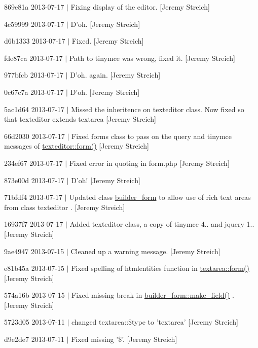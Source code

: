 \begin{DoxyItemize}
\item 869e81a 2013-\/07-\/17 $|$ Fixing display of the editor. \mbox{[}Jeremy Streich\mbox{]}
\item 4c59999 2013-\/07-\/17 $|$ D'oh. \mbox{[}Jeremy Streich\mbox{]}
\item d6b1333 2013-\/07-\/17 $|$ Fixed. \mbox{[}Jeremy Streich\mbox{]}
\item fde87ca 2013-\/07-\/17 $|$ Path to tinymce was wrong, fixed it. \mbox{[}Jeremy Streich\mbox{]}
\item 977bfcb 2013-\/07-\/17 $|$ D'oh. again. \mbox{[}Jeremy Streich\mbox{]}
\item 0c67c7a 2013-\/07-\/17 $|$ D'oh. \mbox{[}Jeremy Streich\mbox{]}
\item 5ac1d64 2013-\/07-\/17 $|$ Missed the inheritence on texteditor class. Now fixed so that texteditor extends textarea \mbox{[}Jeremy Streich\mbox{]}
\item 66d2030 2013-\/07-\/17 $|$ Fixed forms class to pass on the query and tinymce messages of \hyperlink{classtexteditor_a129b929db008ec11f4a683f542787c74}{texteditor\-::form()} \mbox{[}Jeremy Streich\mbox{]}
\item 234ef67 2013-\/07-\/17 $|$ Fixed error in quoting in form.\-php \mbox{[}Jeremy Streich\mbox{]}
\item 873e00d 2013-\/07-\/17 $|$ D'oh! \mbox{[}Jeremy Streich\mbox{]}
\item 71bfdf4 2013-\/07-\/17 $|$ Updated class \hyperlink{classbuilder__form}{builder\-\_\-form} to allow use of rich text areas from class texteditor . \mbox{[}Jeremy Streich\mbox{]}
\item 16937f7 2013-\/07-\/17 $|$ Added texteditor class, a copy of tinymce 4.. and jquery 1.. \mbox{[}Jeremy Streich\mbox{]}
\item 9ae4947 2013-\/07-\/15 $|$ Cleaned up a warning message. \mbox{[}Jeremy Streich\mbox{]}
\item e81b45a 2013-\/07-\/15 $|$ Fixed spelling of htmlentities function in \hyperlink{classtextarea_a3e3d02a7c0ff76c86f6b987e1193ca6a}{textarea\-::form()} \mbox{[}Jeremy Streich\mbox{]}
\item 574a16b 2013-\/07-\/15 $|$ Fixed missing break in \hyperlink{classbuilder__form_a6408926fe73438032738d8a0095acf8d}{builder\-\_\-form\-::make\-\_\-field()} . \mbox{[}Jeremy Streich\mbox{]}
\item 5723d05 2013-\/07-\/11 $|$ changed textarea\-::\$type to 'textarea' \mbox{[}Jeremy Streich\mbox{]}
\item d9e2de7 2013-\/07-\/11 $|$ Fixed missing '\$'. \mbox{[}Jeremy Streich\mbox{]}

\end{DoxyItemize}
